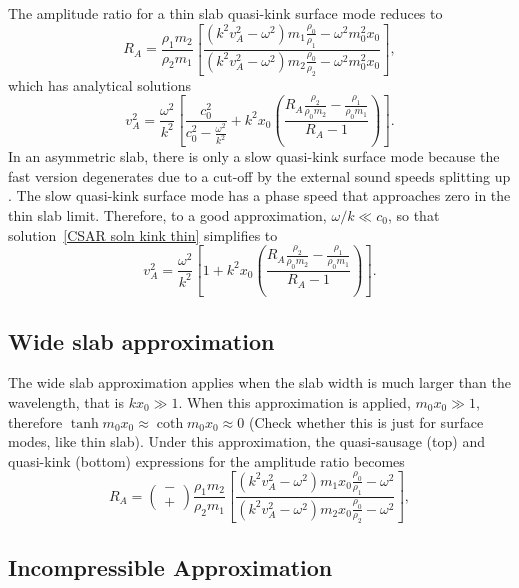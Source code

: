 \documentclass[namedreferences]{solarphysics}
\numberwithin{equation}{section}
\begin{document}
\begin{article}
The amplitude ratio for a thin slab quasi-kink surface mode reduces to
\begin{equation}
R_A = \frac{\rho_1m_2}{\rho_2m_1}\left[\frac{(k^2v_A^2-\omega^2)m_1\frac{\rho_0}{\rho_1}-\omega^2m_0^2x_0}{(k^2v_A^2-\omega^2)m_2\frac{\rho_0}{\rho_2}-\omega^2m_0^2x_0}\right], 
\end{equation}
which has analytical solutions
\begin{equation}
v_A^2 = \frac{\omega^2}{k^2} \left[\frac{c_0^2}{c_0^2 - \frac{\omega^2}{k^2}} + k^2x_0\left(\frac{R_A\frac{\rho_2}{\rho_0m_2} - \frac{\rho_1}{\rho_0m_1}}{R_A - 1}\right)\right]. \label{CSAR soln kink thin}
\end{equation}
In an asymmetric slab, there is only a slow quasi-kink surface mode because the fast version degenerates due to a cut-off by the external sound speeds splitting up \citep{all_etal17}. The slow quasi-kink surface mode has a phase speed that approaches zero in the thin slab limit. Therefore, to a good approximation, $\omega/k \ll c_0$, so that solution~\eqref{CSAR soln kink thin} simplifies to
\begin{equation}
v_A^2 = \frac{\omega^2}{k^2} \left[1 + k^2x_0\left(\frac{R_A\frac{\rho_2}{\rho_0m_2} - \frac{\rho_1}{\rho_0m_1}}{R_A - 1}\right)\right]. \label{CSAR soln kink thin simplified}
\end{equation}

\subsection{Wide slab approximation}
The wide slab approximation applies when the slab width is much larger than the wavelength, that is $kx_0 \gg 1$. When this approximation is applied, $m_0x_0 \gg 1$, therefore $\tanh{m_0x_0} \approx \coth{m_0x_0} \approx 0$ \cite{rob81b} (Check whether this is just for surface modes, like thin slab). Under this approximation, the quasi-sausage (top) and quasi-kink (bottom) expressions for the amplitude ratio becomes
\begin{equation}
R_A = \left(\substack{- \\ +}\right)\frac{\rho_1m_2}{\rho_2m_1}\left[\frac{(k^2v_A^2-\omega^2)m_1x_0\frac{\rho_0}{\rho_1}-\omega^2}{(k^2v_A^2-\omega^2)m_2x_0\frac{\rho_0}{\rho_2}-\omega^2}\right], 
\end{equation}

\subsection{Incompressible Approximation} \label{sec: incomp}


\end{article}
\end{document}

